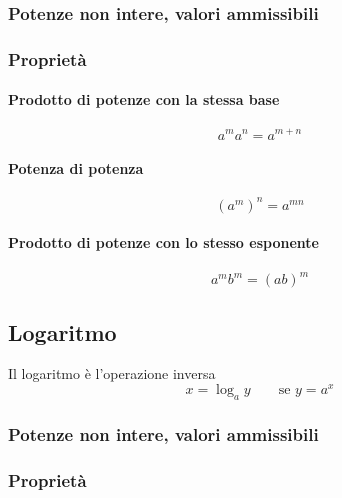 \subsubsection{Potenze non intere, valori ammissibili}
\subsubsection{Proprietà}
\paragraph{Prodotto di potenze con la stessa base}
\begin{equation} a^m a^n = a^{m+n} \end{equation}
\paragraph{Potenza di potenza}
\begin{equation} (a^m)^n = a^{mn} \end{equation}
\paragraph{Prodotto di potenze con lo stesso esponente}
\begin{equation} a^m b^m = (ab)^{m} \end{equation}

\subsection{Logaritmo}
\begin{definition}[Logaritmo] Il logaritmo è l'operazione inversa
\begin{equation}
    x = \log_a y \qquad \text{se $y = a^x$}
\end{equation}
\end{definition}
\subsubsection{Potenze non intere, valori ammissibili}
\subsubsection{Proprietà}
